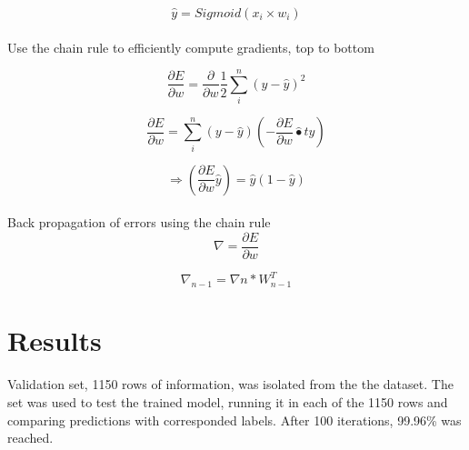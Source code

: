 \documentclass{llncs}       %
\begin{document}
\begin{equation} 
\widehat{y}=Sigmoid(x_{i}\times w_{i})
\end{equation}

\paragraph{} Use the chain rule to efficiently compute gradients, top to bottom

\begin{equation} 
\frac{\partial E}{\partial w}=\frac{\partial }{\partial w} \frac{1}{2}\sum_i^n( y -\widehat{y})^2
\end{equation}

\begin{equation} 
\frac{\partial E}{\partial w} = \sum_i^n ( y -\widehat{y})  (-\frac{\partial E}{\partial w}\widehat{•}t{y})
\end{equation}

\begin{equation} 
\Rightarrow(\frac{\partial E}{\partial w}\widehat{y})= \widehat{y}(1-\widehat{y})
\end{equation}

\paragraph{}Back propagation of errors using the chain rule
\begin{equation} 
\nabla=\frac{\partial E}{\partial w}
\end{equation}

\begin{equation} 
\nabla_{n-1}=\nabla{n}*W^{T}_{n-1}
\end{equation}



\paragraph{}\paragraph{}
\section{Results}
\label{sec:4}
Validation set, 1150 rows of information, was isolated from the the dataset.   The set was used to test the trained model, running it in each of the 1150 rows and comparing predictions with corresponded labels.  After 100 iterations, 99.96\% was reached.
\end{document}
